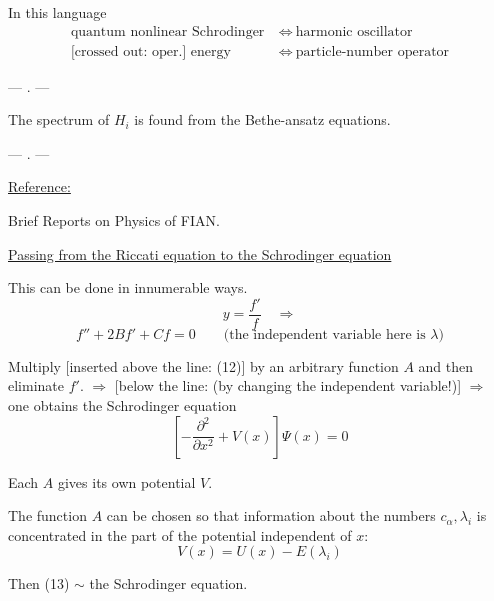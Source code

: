 In this language
\begin{equation*}
\begin{aligned}
\text{quantum nonlinear Schrodinger}&\ \Longleftrightarrow\ \text{harmonic oscillator}\\
\text{[crossed out: oper.] energy}&\ \Longleftrightarrow\ \text{particle-number operator}
\end{aligned}
\end{equation*}

\begin{center}— . —\end{center}

The spectrum of $H_i$ is found from the Bethe-ansatz equations.

\begin{center}— . —\end{center}

\underline{Reference:}

Brief Reports on Physics of FIAN.

\underline{Passing from the Riccati equation to the Schrodinger equation}

This can be done in innumerable ways.
\begin{equation*}
y=\frac{f'}{f}\quad\Longrightarrow
\end{equation*}
\begin{equation*}
f''+2Bf'+Cf=0
\qquad\text{(the independent variable here is $\lambda$)}
\tag{12}
\end{equation*}

Multiply [inserted above the line: (12)] by an arbitrary function $A$ and then eliminate $f'$.
$\Longrightarrow$ [below the line: (by changing the independent variable!)]
$\Longrightarrow$ one obtains the Schrodinger equation
\begin{equation*}
\left[-\frac{\partial^2}{\partial x^2}+V(x)\right]\Psi(x)=0
\tag{13}
\end{equation*}

Each $A$ gives its own potential $V$.

The function $A$ can be chosen so that information about the numbers
$c_\alpha,\lambda_i$ is concentrated in the part of the potential independent of $x$:
\begin{equation*}
V(x)=U(x)-E(\lambda_i)
\tag{14}
\end{equation*}

Then (13) 
$\sim$ the Schrodinger equation.

